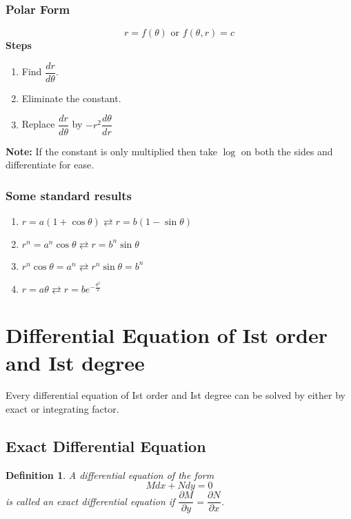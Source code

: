 \documentclass[a4paper, titlepage]{article}
\newtheorem{definition}{Definition}[section]
\begin{document}
        \subsubsection{Polar Form}
        \[ r = f(\theta) \text{ or } f(\theta,r) = c \]
        \textbf{Steps}
        \begin{enumerate}[label=\textbf{\arabic*}]
            \item Find $\dfrac{dr}{d\theta}.$
            \item Eliminate the constant.
            \item Replace $\dfrac{dr}{d\theta}$ by $-r^2\dfrac{d\theta}{dr}$
        \end{enumerate}
        \textbf{Note: }If the constant is only multiplied then take
        $\log$ on both the sides and differentiate for ease.
        \subsubsection{Some standard results}
        \begin{enumerate}
            \item $r = a(1+\cos \theta) \rightleftarrows r = b(1 - \sin \theta)$
            \item $r^n = a^n\cos \theta \rightleftarrows r = b^n\sin \theta$
            \item $r^n\cos \theta = a^n \rightleftarrows r^n\sin \theta = b^n$
            \item $r = a\theta \rightleftarrows r = be^{-\frac{\theta^2}{2}}$
        \end{enumerate}

        \section{Differential Equation of Ist order and Ist degree}
        Every differential equation of Ist order and Ist degree can be solved by either by exact or integrating factor.
        \subsection{Exact Differential Equation}
        \begin{definition} 
        A differential equation of the form \[ Mdx + Ndy = 0 \] is called an exact differential equation if $\dfrac{\partial M}{\partial y} = \dfrac{\partial N}{\partial x}$.
        \end{definition}
        
\end{document}
